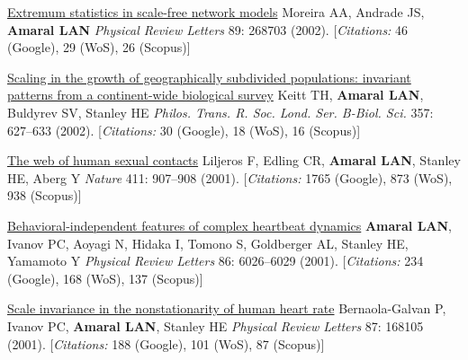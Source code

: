 \NumberedItem{\makebox[0.8cm][r]{[40]}}
\href{/people/amaral/extremum-statistics-in-scale-free-network-models}
{Extremum statistics in scale-free network models}
\newline
Moreira AA, Andrade JS, {\textbf{Amaral LAN}}
\newline
\textit{Physical Review Letters}
    89:
268703 (2002).
    [{\em{Citations:}} 46 (Google), 29 (WoS), 26 (Scopus)]
\newline
\Gap
~
\Gap

\NumberedItem{\makebox[0.8cm][r]{[39]}}
\href{/people/amaral/scaling-in-the-growth-of-geographically-subdivided-populations-invariant-patterns-from-a-continent-wide-biological-survey}
{Scaling in the growth of geographically subdivided populations: invariant patterns from a continent-wide biological survey}
\newline
Keitt TH, {\textbf{Amaral LAN}}, Buldyrev SV, Stanley HE
\newline
\textit{Philos. Trans. R. Soc. Lond. Ser. B-Biol. Sci.}
    357:
627--633 (2002).
    [{\em{Citations:}} 30 (Google), 18 (WoS), 16 (Scopus)]
\newline
\Gap
~
\Gap

\NumberedItem{\makebox[0.8cm][r]{[38]}}
\href{/people/amaral/the-web-of-human-sexual-contacts}
{The web of human sexual contacts}
\newline
Liljeros F, Edling CR, {\textbf{Amaral LAN}}, Stanley HE, Aberg Y
\newline
\textit{Nature}
    411:
907--908 (2001).
    [{\em{Citations:}} 1765 (Google), 873 (WoS), 938 (Scopus)]
\newline
\Gap
~
\Gap

\NumberedItem{\makebox[0.8cm][r]{[37]}}
\href{/people/amaral/behavioral-independence-features-of-complex-heartbeat-dynamics}
{Behavioral-independent features of complex heartbeat dynamics}
\newline
{\textbf{Amaral LAN}}, Ivanov PC, Aoyagi N, Hidaka I, Tomono S, Goldberger AL, Stanley HE, Yamamoto Y
\newline
\textit{Physical Review Letters}
    86:
6026--6029 (2001).
    [{\em{Citations:}} 234 (Google), 168 (WoS), 137 (Scopus)]
\newline
\Gap
~
\Gap

\NumberedItem{\makebox[0.8cm][r]{[36]}}
\href{/people/amaral/scale-invariance-in-the-nonstationarity-of-human-heart-rate}
{Scale invariance in the nonstationarity of human heart rate}
\newline
Bernaola-Galvan P, Ivanov PC, {\textbf{Amaral LAN}}, Stanley HE
\newline
\textit{Physical Review Letters}
    87:
168105 (2001).
    [{\em{Citations:}} 188 (Google), 101 (WoS), 87 (Scopus)]
\newline
\Gap
~
\Gap

